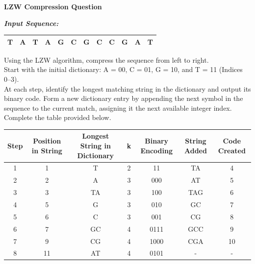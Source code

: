 \documentclass[11pt]{article}
\begin{document}
\begin{center}
{\Large \textbf{LZW Compression Question}}
\end{center}
\vspace{1em}
\noindent \textit{\textbf{Input Sequence:}}
\begin{center}
\renewcommand{\arraystretch}{1.5}
\begin{tabular}{|c|c|c|c|c|c|c|c|c|c|c|c|}
\hline
\rowcolor{white!95!black} T & A & T & A & G & C & G & C & C & G & A & T \\
\hline
\end{tabular}
\end{center}
\vspace{1em}
\noindent Using the LZW algorithm, compress the sequence from left to right. \\[1.5em]
Start with the initial dictionary: A = 00, C = 01, G = 10, and T = 11 (Indices 0--3). \\[1.5em]
At each step, identify the longest matching string in the dictionary and output its binary code. Form a new dictionary entry by appending the next symbol in the sequence to the current match, assigning it the next available integer index. Complete the table provided below.
\vspace{3em}
\par
{}
\vspace{1em}
\begin{center}
\small
\renewcommand{\arraystretch}{1.4}
\begin{tabular}{|c|c|c|c|c|c|c|}
\hline
\rowcolor{lightgray} Step & Position in String & Longest String in Dictionary & k & Binary Encoding & String Added & Code Created \\
\hline
1 & 1 & T & 2 & 11 & TA & 4 \\ \hline
2 & 2 & A & 3 & 000 & AT & 5 \\ \hline
3 & 3 & TA & 3 & 100 & TAG & 6 \\ \hline
4 & 5 & G & 3 & 010 & GC & 7 \\ \hline
5 & 6 & C & 3 & 001 & CG & 8 \\ \hline
6 & 7 & GC & 4 & 0111 & GCC & 9 \\ \hline
7 & 9 & CG & 4 & 1000 & CGA & 10 \\ \hline
8 & 11 & AT & 4 & 0101 & - & - \\ \hline
\end{tabular}
\end{center}
\vspace{1em}
\end{document}
